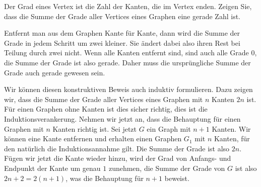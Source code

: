 Der Grad eines Vertex ist die Zahl der Kanten, die im Vertex enden.
Zeigen Sie, dass die Summe der Grade aller Vertices eines Graphen
eine gerade Zahl ist.


\begin{loesung}
Entfernt man aus dem Graphen Kante für Kante, dann wird die
Summe der Grade in jedem Schritt um zwei kleiner. Sie ändert
dabei also ihren Rest bei Teilung durch zwei nicht. Wenn alle
Kanten entfernt sind, sind auch alle Grade 0, die Summe der
Grade ist also gerade. Daher muss die ursprüngliche Summe der
Grade auch gerade gewesen sein.

Wir können diesen konstruktiven Beweis auch induktiv formulieren.
Dazu zeigen wir, dass die Summe der Grade aller Vertices eines Graphen
mit $n$ Kanten $2n$ ist. Für einen Graphen ohne Kanten ist dies
sicher richtig, dies ist die Induktionsverankerung. Nehmen wir
jetzt an, dass die Behauptung für einen Graphen mit $n$ Kanten
richtig ist. Sei jetzt $G$ ein Graph mit $n+1$ Kanten. Wir können
eine Kante entfernen und erhalten einen Graphen $G_1$ mit $n$
Kanten, für den natürlich die Induktionsannahme gilt. Die Summe
der Grade ist also $2n$. Fügen wir jetzt die Kante wieder hinzu,
wird der Grad von Anfangs- und Endpunkt der Kante um genau $1$
zunehmen, die Summe der Grade von $G$ ist also $2n+2=2(n+1)$,
was die Behauptung für $n+1$ beweist.
\end{loesung}

